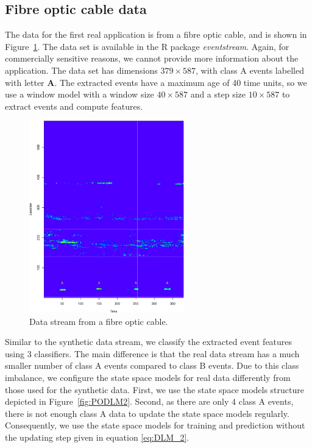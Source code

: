 \documentclass[a4paper,11pt]{article}
\begin{document}
\subsection{Fibre optic cable data}\label{sec:FibreOpticExperiment}

The data for the first real application is from a fibre optic cable, and is shown in Figure~\ref{fig:Real_World_Data_Stream}.  The data set is available in the R package \textit{eventstream}. Again, for commercially sensitive reasons, we cannot provide more information about the application. The data set has dimensions $379 \times 587$, with class A events labelled with letter \textbf{A}. The extracted events have a maximum age of 40 time units, so we use a window model with a window size $40 \times 587$ and a step size $10 \times 587$ to extract events and compute features.

\begin{figure}[!b]
	\centering
	\includegraphics[width=0.6\textwidth]{./Graphics/Real_World_stream.pdf}
	\caption{Data stream from a fibre optic cable.}
	\label{fig:Real_World_Data_Stream}
\end{figure}

Similar to the synthetic data stream, we classify the extracted event features using 3 classifiers. The main difference is that the real data stream has a much smaller number of class A events compared to class B events. Due to this class imbalance, we configure the state space models for real data differently from those used for the synthetic data. First, we use the state space models structure depicted in Figure~\ref{fig:PODLM2}. Second, as there are only $4$ class A events, there is not enough class A data to update the state space models regularly. Consequently, we use the state space models for training and prediction without the updating step given in equation \eqref{eq:DLM_2}.
\end{document}
